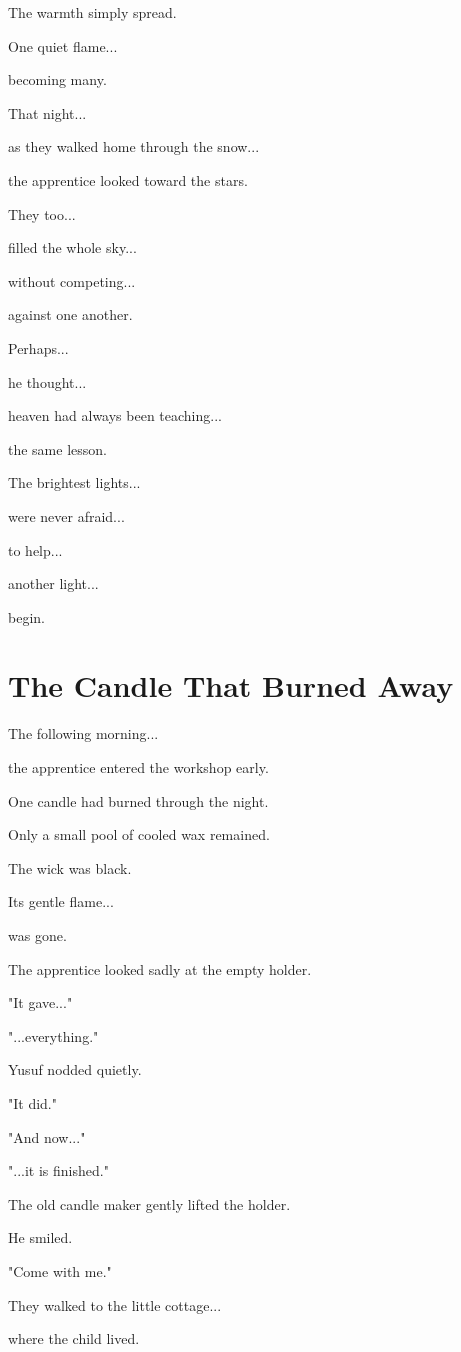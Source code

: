 \documentclass[12pt,openany]{book}
\begin{document}
The warmth simply spread.

One quiet flame...

becoming many.

That night...

as they walked home through the snow...

the apprentice looked toward the stars.

They too...

filled the whole sky...

without competing...

against one another.

Perhaps...

he thought...

heaven had always been teaching...

the same lesson.

The brightest lights...

were never afraid...

to help...

another light...

begin.
\section*{The Candle That Burned Away}

The following morning...

the apprentice entered the workshop early.

One candle had burned through the night.

Only a small pool of cooled wax remained.

The wick was black.

Its gentle flame...

was gone.

The apprentice looked sadly at the empty holder.

"It gave..."

"...everything."

Yusuf nodded quietly.

"It did."

"And now..."

"...it is finished."

The old candle maker gently lifted the holder.

He smiled.

"Come with me."

They walked to the little cottage...

where the child lived.
\end{document}
